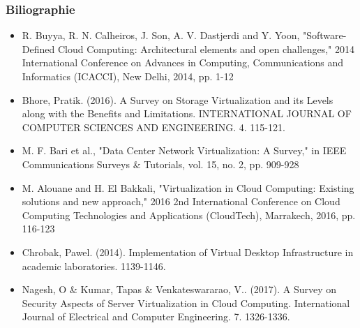 \documentclass{beamer}
\begin{document}
\begin{frame}
\frametitle{Biliographie}
\begin{itemize}
    \fontsize{6pt}{7.2}\selectfont

    \item R. Buyya, R. N. Calheiros, J. Son, A. V. Dastjerdi and Y. Yoon, "Software-Defined Cloud Computing: Architectural elements and open challenges," 2014 International Conference on Advances in Computing, Communications and Informatics (ICACCI), New Delhi, 2014, pp. 1-12
    \item Bhore, Pratik. (2016). A Survey on Storage Virtualization and its Levels along with the Benefits and Limitations. INTERNATIONAL JOURNAL OF COMPUTER SCIENCES AND ENGINEERING. 4. 115-121.
    \item M. F. Bari et al., "Data Center Network Virtualization: A Survey," in IEEE Communications Surveys \& Tutorials, vol. 15, no. 2, pp. 909-928
    \item M. Alouane and H. El Bakkali, "Virtualization in Cloud Computing: Existing solutions and new approach," 2016 2nd International Conference on Cloud Computing Technologies and Applications (CloudTech), Marrakech, 2016, pp. 116-123
    \item Chrobak, Pawel. (2014). Implementation of Virtual Desktop Infrastructure in academic laboratories. 1139-1146.
    \item Nagesh, O \& Kumar, Tapas \& Venkateswararao, V.. (2017). A Survey on Security Aspects of Server Virtualization in Cloud Computing. International Journal of Electrical and Computer Engineering. 7. 1326-1336.
\end{itemize}

\end{frame}
\end{document}
